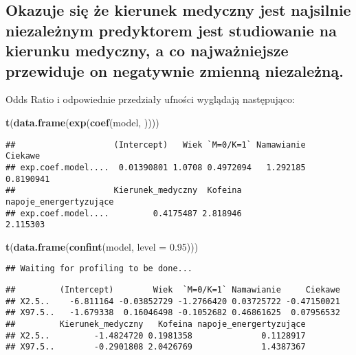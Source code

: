\documentclass[]{article}
\newenvironment{Shaded}{\begin{snugshade}}{\end{snugshade}}
\newcommand{\KeywordTok}[1]{\textcolor[rgb]{0.13,0.29,0.53}{\textbf{#1}}}
\newcommand{\DataTypeTok}[1]{\textcolor[rgb]{0.13,0.29,0.53}{#1}}
\newcommand{\FloatTok}[1]{\textcolor[rgb]{0.00,0.00,0.81}{#1}}
\newcommand{\NormalTok}[1]{#1}
\begin{document}
\subsection{\texorpdfstring{Okazuje się że kierunek medyczny jest
najsilnie niezależnym predyktorem jest studiowanie na kierunku medyczny,
a co najważniejsze \textbf{przewiduje on negatywnie} zmienną
niezależną.}{Okazuje się że kierunek medyczny jest najsilnie niezależnym predyktorem jest studiowanie na kierunku medyczny, a co najważniejsze przewiduje on negatywnie zmienną niezależną.}}\label{okazuje-sie-ze-kierunek-medyczny-jest-najsilnie-niezaleznym-predyktorem-jest-studiowanie-na-kierunku-medyczny-a-co-najwazniejsze-przewiduje-on-negatywnie-zmienna-niezalezna.}

Odds Ratio i odpowiednie przedziały ufności wyglądają następująco:

\begin{Shaded}
\begin{Highlighting}[]
\KeywordTok{t}\NormalTok{(}\KeywordTok{data.frame}\NormalTok{(}\KeywordTok{exp}\NormalTok{(}\KeywordTok{coef}\NormalTok{(model, ))))}
\end{Highlighting}
\end{Shaded}

\begin{verbatim}
##                    (Intercept)   Wiek `M=0/K=1` Namawianie   Ciekawe
## exp.coef.model....  0.01390801 1.0708 0.4972094   1.292185 0.8190941
##                    Kierunek_medyczny  Kofeina napoje_energertyzujące
## exp.coef.model....         0.4175487 2.818946               2.115303
\end{verbatim}

\begin{Shaded}
\begin{Highlighting}[]
\KeywordTok{t}\NormalTok{(}\KeywordTok{data.frame}\NormalTok{(}\KeywordTok{confint}\NormalTok{(model, }\DataTypeTok{level =} \FloatTok{0.95}\NormalTok{)))}
\end{Highlighting}
\end{Shaded}

\begin{verbatim}
## Waiting for profiling to be done...
\end{verbatim}

\begin{verbatim}
##         (Intercept)        Wiek  `M=0/K=1` Namawianie     Ciekawe
## X2.5..    -6.811164 -0.03852729 -1.2766420 0.03725722 -0.47150021
## X97.5..   -1.679338  0.16046498 -0.1052682 0.46861625  0.07956532
##         Kierunek_medyczny   Kofeina napoje_energertyzujące
## X2.5..         -1.4824720 0.1981358              0.1128917
## X97.5..        -0.2901808 2.0426769              1.4387367
\end{verbatim}
\end{document}
